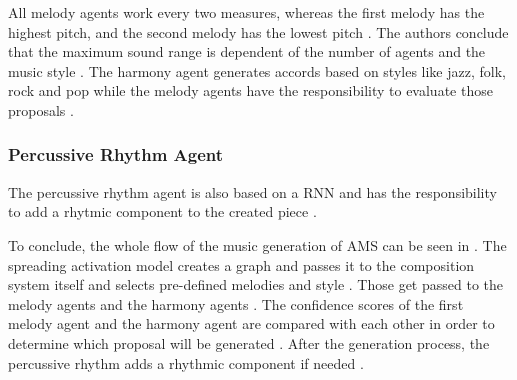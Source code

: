 All melody agents work every two measures, whereas the
first melody has the highest pitch, and the second melody 
has the lowest pitch \cite{hutMcCormAms}. The authors conclude that the 
maximum sound range is dependent of the number of agents
and the music style \cite{hutMcCormAms}.
The harmony agent generates accords based on styles like
jazz, folk, rock and pop while the melody agents 
have the responsibility to evaluate those proposals \cite{hutMcCormAms}.

\subsubsection{Percussive Rhythm Agent}

The percussive rhythm agent is also based on a RNN and
has the responsibility to add a rhytmic component to
the created piece \cite{hutMcCormAms}.



To conclude, the whole flow of the music generation of AMS can be seen in 
. The spreading activation model creates a graph
and passes it to the composition system itself and selects pre-defined melodies
and style \cite{hutMcCormAms}. Those get passed to the melody agents and the harmony agents \cite{hutMcCormAms}.
The confidence scores of the first melody agent and the harmony agent are compared
with each other in order to determine which proposal will be generated \cite{hutMcCormAms}.
After the generation process, the percussive rhythm adds a rhythmic component if needed \cite{hutMcCormAms}.







